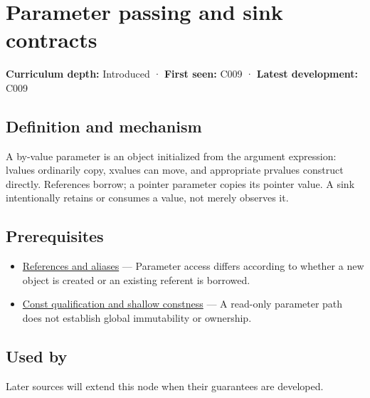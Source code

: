 \hypertarget{appendix-d5908f75721f}{}\label{referencestart:appendix-d5908f75721f}
\section{Parameter passing and sink contracts}\label{appendix-d5908f75721f-parameter-passing-and-sink-contracts}

\textbf{Curriculum depth:} Introduced · \textbf{First seen:} C009 · \textbf{Latest development:} C009

\begin{allmightroledefinition}

\subsection{Definition and mechanism}\label{appendix-d5908f75721f-definition-and-mechanism}

A by-value parameter is an object initialized from the argument expression: lvalues ordinarily copy, xvalues can move, and appropriate prvalues construct directly. References borrow; a pointer parameter copies its pointer value. A sink intentionally retains or consumes a value, not merely observes it.

\end{allmightroledefinition}

\subsection{Prerequisites}\label{appendix-d5908f75721f-prerequisites}

\begin{itemize}
\tightlist
\item
  \hyperref[appendix-d6d562ca9fbb]{References and aliases} --- Parameter access differs according to whether a new object is created or an existing referent is borrowed.
\item
  \hyperref[appendix-c25d60fed375]{Const qualification and shallow constness} --- A read-only parameter path does not establish global immutability or ownership.
\end{itemize}

\subsection{Used by}\label{appendix-d5908f75721f-used-by}

Later sources will extend this node when their guarantees are developed.

